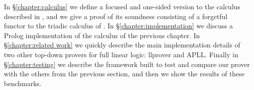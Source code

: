 In \S\ref{chapter:calculus} we define a focused and one-sided version to the calculus described in \cite{HarlandPym}, and we give a proof of its soundness consisting of a forgetful functor to the triadic calculus of \cite{Focusing}.
In \S\ref{chapter:implementation} we discuss a Prolog implementation of the calculus of the previous chapter.
In \S\ref{chapter:related work} we quickly describe the main implementation details of two other top-down provers for full linear logic: llprover and APLL.
Finally in \S\ref{chapter:testing} we describe the framework built to test and compare our prover with the others from the previous section, and then we show the results of these benchmarks.
